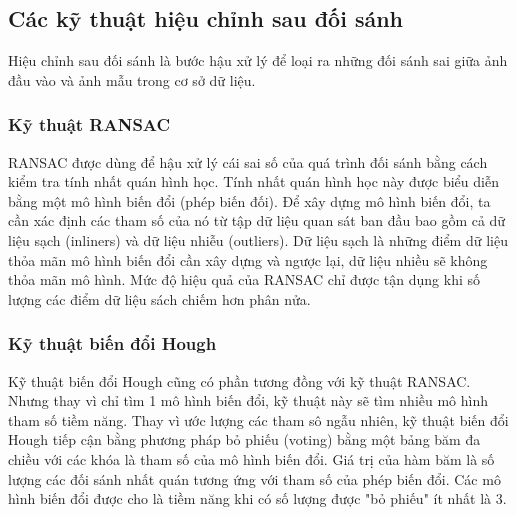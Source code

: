 \subsection{Các kỹ thuật hiệu chỉnh sau đối sánh}
Hiệu chỉnh sau đối sánh là bước hậu xử lý để loại ra những đối sánh sai giữa ảnh đầu vào và ảnh mẫu trong cơ sở dữ liệu. 

\subsubsection{Kỹ thuật RANSAC}
RANSAC được dùng để hậu xử lý cái sai số của quá trình đối sánh bằng cách kiểm tra tính nhất quán hình học. Tính nhất quán hình học này được biểu diễn bằng một mô hình biến đổi (phép biến đối). Để xây dựng mô hình biến đổi, ta cần xác định các tham số của nó từ tập dữ liệu quan sát ban đầu bao gồm cả dữ liệu sạch (inliners) và dữ liệu nhiễu (outliers). Dữ liệu sạch là những điểm dữ liệu thỏa mãn mô hình biến đổi cần xây dựng và ngược lại, dữ liệu nhiều sẽ không thỏa mãn mô hình. Mức độ hiệu quả của RANSAC chỉ được tận dụng khi số lượng các điểm dữ liệu sách chiếm hơn phân nửa.

\subsubsection{Kỹ thuật biến đổi Hough}
Kỹ thuật biến đổi Hough cũng có phần tương đồng với kỹ thuật RANSAC. Nhưng thay vì chỉ tìm 1 mô hình biến đổi, kỹ thuật này sẽ tìm nhiều mô hình tham số tiềm năng. Thay vì ước lượng các tham sô ngẫu nhiên, kỹ thuật biến đổi Hough tiếp cận bằng phương pháp bỏ phiếu (voting) bằng một bảng băm đa chiều với các khóa là tham số của mô hình biến đổi. Giá trị của hàm băm là số lượng các đối sánh nhất quán tương ứng với tham số của phép biến đổi. Các mô hình biến đổi được cho là tiềm năng khi có số lượng được "bỏ phiếu" ít nhất là 3.
